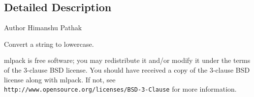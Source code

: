 \subsection{Detailed Description}
\begin{DoxyAuthor}{Author}
Himanshu Pathak
\end{DoxyAuthor}
Convert a string to lowercase.

mlpack is free software; you may redistribute it and/or modify it under the terms of the 3-\/clause B\+SD license. You should have received a copy of the 3-\/clause B\+SD license along with mlpack. If not, see {\tt http\+://www.\+opensource.\+org/licenses/\+B\+S\+D-\/3-\/\+Clause} for more information. 